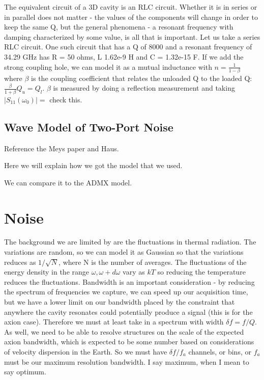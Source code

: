 \documentclass[11pt]{article}
\begin{document}
The equivalent circuit of a 3D cavity is an RLC circuit. Whether it is in series or in parallel does not matter - the values of the components will change in order to keep the same Q, but the general phenomena - a resonant frequency with damping characterized by some value, is all that is important.
Let us take a series RLC circuit. One such circuit that has a Q of 8000 and a resonant frequency of 34.29 GHz has R = 50 ohms, L  1.62e-9 H and C = 1.32e-15 F. If we add the strong coupling hole, we can model it as a mutual inductance with $n=\frac{1}{1-\beta}$ where $\beta$ is the coupling coefficient that relates the unloaded Q to the loaded Q: $\frac{\beta}{1+\beta}Q_u = Q_l$. $\beta$ is measured by doing a reflection measurement and taking $|S_{11}(\omega_0)| =$ check this.

\subsection{Wave Model of Two-Port Noise}
Reference the Meys paper and Haus.

Here we will explain how we got the model that we used.

We can compare it to the ADMX model.

\section{Noise}

The background we are limited by are the fluctuations in thermal radiation. The variations are random, so we can model it as Gaussian so that the variations reduces as $1/\sqrt{N}$, where N is the number of averages. The fluctuations of the energy density in the range $\omega, \omega +d\omega$ vary as $kT$ so reducing the temperature reduces the fluctuations. Bandwidth is an important consideration - by reducing the spectrum of frequencies we capture, we can speed up our acquisition time, but we have a lower limit on our bandwidth placed by the constraint that anywhere the cavity resonates could potentially produce a signal (this is for the axion case). Therefore we must at least take in a spectrum with width $\delta f = f/Q$. As well, we need to be able to resolve structures on the scale of the expected axion bandwidth, which is expected to be some number based on considerations of velocity dispersion in the Earth. So we must have $\delta f/f_a$ channels, or bins, or $f_a$ must be our maximum resolution bandwidth. I say maximum, when I mean to say optimum.
\end{document}
